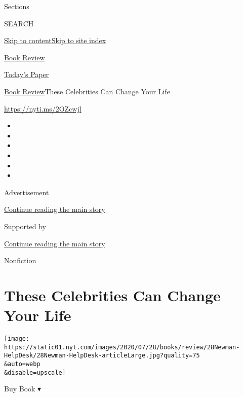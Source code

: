 Sections

SEARCH

\protect\hyperlink{site-content}{Skip to
content}\protect\hyperlink{site-index}{Skip to site index}

\href{https://www.nytimes.com/section/books/review}{Book Review}

\href{https://myaccount.nytimes.com/auth/login?response_type=cookie\&client_id=vi}{}

\href{https://www.nytimes.com/section/todayspaper}{Today's Paper}

\href{/section/books/review}{Book Review}\textbar{}These Celebrities Can
Change Your Life

\url{https://nyti.ms/2OZcwjl}

\begin{itemize}
\item
\item
\item
\item
\item
\item
\end{itemize}

Advertisement

\protect\hyperlink{after-top}{Continue reading the main story}

Supported by

\protect\hyperlink{after-sponsor}{Continue reading the main story}

Nonfiction

\hypertarget{these-celebrities-can-change-your-life}{%
\section{These Celebrities Can Change Your
Life}\label{these-celebrities-can-change-your-life}}

\texttt{[image: https://static01.nyt.com/images/2020/07/28/books/review/28Newman-HelpDesk/28Newman-HelpDesk-articleLarge.jpg?quality=75\\\&auto=webp\\\&disable=upscale]}

Buy Book ▾

